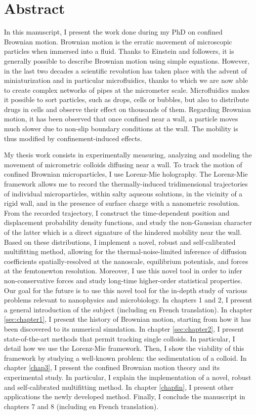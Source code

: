 \section*{Abstract}
In this manuscript, I present the work done during my PhD on confined Brownian motion. Brownian motion is the erratic movement of microscopic particles when immersed into a fluid. Thanks to Einstein and followers, it is generally possible to describe Brownian motion using simple equations. However, in the last two decades a scientific revolution has taken place with the advent of miniaturization and in particular microfluidics, thanks to which we are now able to create complex networks of pipes at the micrometer scale. Microfluidics makes it possible to sort particles, such as drops, cells or bubbles, but also to distribute drugs in cells and observe their effect on thousands of them. Regarding Brownian motion, it has been observed that once confined near a wall, a particle moves much slower due to non-slip boundary conditions at the wall. The mobility is thus modified by confinement-induced effects.

My thesis work consists in experimentally measuring, analyzing and modeling the movement of micrometric colloids diffusing near a wall. To track the motion of confined Brownian microparticles, I use Lorenz-Mie holography. The Lorenz-Mie framework allows me to record the thermally-induced tridimensional trajectories of individual microparticles, within salty aqueous solutions, in the vicinity of a rigid wall, and in the presence of surface charge with a nanometric resolution. From the recorded trajectory, I construct the time-dependent position and displacement probability density functions, and study the non-Gaussian character of the latter which is a direct signature of the hindered mobility near the wall. Based on these distributions, I implement a novel, robust and self-calibrated multifitting method, allowing for the thermal-noise-limited inference of diffusion coefficients spatially-resolved at the nanoscale, equilibrium potentials, and forces at the femtonewton resolution. Moreover, I use this novel tool in order to infer non-conservative forces and study long-time higher-order statistical properties. Our goal for the future is to use this novel tool for the in-depth study of various problems relevant to nanophysics and microbiology.
In chapters 1 and 2, I present a general introduction of the subject (including en French translation). In chapter \ref{sec:chapter1}, I present the history of Brownian motion, starting from how it has been discovered to its numerical simulation. In chapter \ref{sec:chapter2}, I present state-of-the-art methods that permit tracking single colloids. In particular, I detail how we use the Lorenz-Mie framework. Then, I show the viability of this framework by studying a well-known problem: the sedimentation of a colloid. In chapter \ref{chap3}, I present the confined Brownian motion theory and its experimental study. In particular, I explain  the implementation of a novel, robust and self-calibrated multifitting method. In chapter \ref{chapfin}, I present other applications the newly developed method. Finally, I conclude the manuscript in chapters 7 and 8 (including en French translation).

